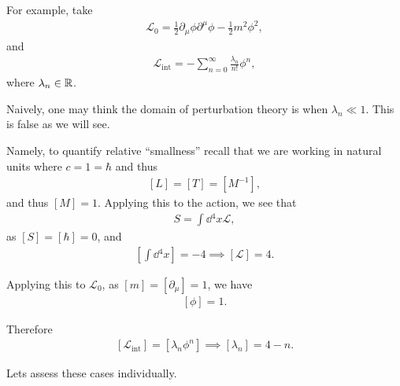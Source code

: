 For example, take
\begin{align}
    \mathcal{L}_0 = \frac{1}{2} \partial_\mu \phi \partial^{\mu} \phi - \frac{1}{2}m^2 \phi^2
,\end{align}
and
\begin{align}
    \mathcal{L}_{\text{int}} = - \sum_{n=0}^{\infty} \frac{\lambda_n}{n!} \phi^{n}
,\end{align}
where $\lambda_n \in \mathbb{R}$.

Naively, one may think the domain of perturbation theory is when $\lambda_n \ll 1$. This is false as we will see.

Namely, to quantify relative ``smallness'' recall that we are working in natural units where $c = 1 = \hbar$ and thus
\begin{align}
    \left[ L \right] = \left[ T \right] = \left[ M^{-1} \right] 
,\end{align}
and thus $\left[ M \right] = 1$. Applying this to the action, we see that
\begin{align}
    S = \int \dd{^{4}x} \mathcal{L}
,\end{align}
as $\left[ S \right] = \left[ \hbar \right] = 0$, and
\begin{align}
    \left[ \int \dd{^{4}x} \right] = - 4 \implies \left[ \mathcal{L} \right] = 4
.\end{align}

Applying this to $\mathcal{L}_0$, as $\left[ m \right] = \left[ \partial_\mu \right] = 1$, we have
\begin{align}
    \left[ \phi \right] = 1
.\end{align}

Therefore
\begin{align}
    \left[ \mathcal{L}_{\text{int}} \right] = \left[ \lambda_n \phi^{n} \right] \implies \left[ \lambda_n \right] = 4 - n
.\end{align}

Lets assess these cases individually.

